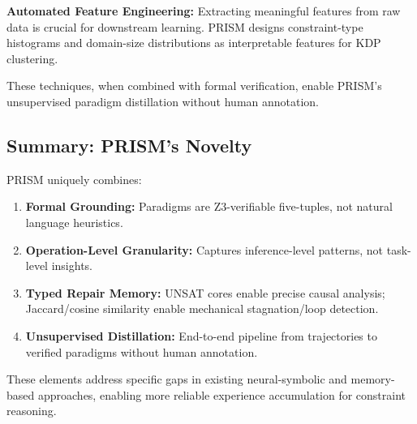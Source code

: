 \textbf{Automated Feature Engineering:} Extracting meaningful features from raw data is crucial for downstream learning. PRISM designs constraint-type histograms and domain-size distributions as interpretable features for KDP clustering.

These techniques, when combined with formal verification, enable PRISM's unsupervised paradigm distillation without human annotation.

\subsection{Summary: PRISM's Novelty}

PRISM uniquely combines:
\begin{enumerate}
    \item \textbf{Formal Grounding:} Paradigms are Z3-verifiable five-tuples, not natural language heuristics.
    \item \textbf{Operation-Level Granularity:} Captures inference-level patterns, not task-level insights.
    \item \textbf{Typed Repair Memory:} UNSAT cores enable precise causal analysis; Jaccard/cosine similarity enable mechanical stagnation/loop detection.
    \item \textbf{Unsupervised Distillation:} End-to-end pipeline from trajectories to verified paradigms without human annotation.
\end{enumerate}

These elements address specific gaps in existing neural-symbolic and memory-based approaches, enabling more reliable experience accumulation for constraint reasoning.
